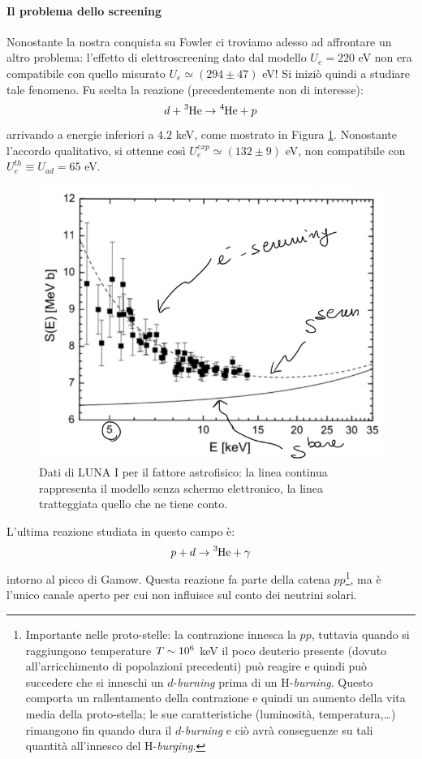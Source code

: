 \paragraph{Il problema dello screening} Nonostante la nostra conquista su Fowler ci troviamo adesso ad affrontare un altro problema: l'effetto di elettroscreening dato dal modello $U_e = 220$ eV non era compatibile con quello misurato $U_e\simeq (294 \pm 47)$ eV! Si iniziò quindi a studiare tale fenomeno. Fu scelta la reazione (precedentemente non di interesse):
$$d + \ce{^3He} \to \ce{^4He} + p$$
arrivando a energie inferiori a $4.2$ keV, come mostrato in Figura \ref{0415_escreen}. Nonostante l'accordo qualitativo, si ottenne così $U_e^{exp} \simeq (132\pm 9) $ eV, non compatibile con $U_e^{th}\equiv U_{ad} = 65$ eV.

\begin{figure}[!h]
	\centering
	\includegraphics[scale=0.7]{Immagini/0415_SE.png}
	\caption{Dati di LUNA I per il fattore astrofisico: la linea continua rappresenta il modello senza schermo elettronico, la linea tratteggiata quello che ne tiene conto.}
	\label{0415_escreen}
\end{figure}
\noindent L'ultima reazione studiata in questo campo è:
$$p + d \to \ce{^3He} + \gamma$$
intorno al picco di Gamow. Questa reazione fa parte della catena $pp$\footnote{Importante nelle proto-stelle: la contrazione innesca la $pp$, tuttavia quando si raggiungono temperature $T\sim 10^{6}$ keV il poco deuterio presente (dovuto all'arricchimento di popolazioni precedenti) può reagire e quindi può succedere che si inneschi un $d$-\textit{burning} prima di un H-\textit{burning}. Questo comporta un rallentamento della contrazione e quindi un aumento della vita media della proto-stella; le sue caratteristiche (luminosità, temperatura,\dots) rimangono  fin quando dura il $d$-\textit{burning} e ciò avrà conseguenze su tali quantità all'innesco del H-\textit{burging}.}, ma è l'unico canale aperto per cui non influisce sul conto dei neutrini solari. 
